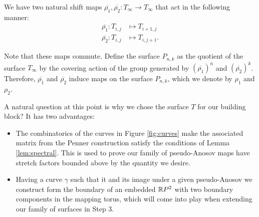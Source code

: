 We have two
natural shift maps $\overline{\rho_1},\overline{\rho_2}: T_\infty \to T_\infty$ that act in the
following manner:
\begin{align*}
  \overline{\rho_1}: T_{i,j} &\mapsto T_{i+1, j} \\
  \overline{\rho_2}: T_{i,j} &\mapsto T_{i, j+1}.
\end{align*}

Note that these maps commute. Define the surface $P_{n,k}$ as the quotient of the surface $T_\infty$ by the
covering action of the group generated by $(\overline{\rho_1})^n$ and $(\overline{\rho_2})^k$. Therefore,
$\overline{\rho_1}$ and $\overline{\rho_2}$ induce maps on the surface $P_{n,k}$, which we denote by $\rho_1$
and $\rho_2$.

A natural question at this point is why we chose the surface $T$ for our building block? It has two advantages:
\begin{itemize}
\item The combinatorics of the curves in Figure \ref{fig:curves} make the associated matrix from the Penner construction satisfy
  the conditions of Lemma \ref{lem:spectral}. This is used to prove our family of pseudo-Anosov maps have
  stretch factors bounded above by the quantity we desire.
\item Having a curve $\gamma$ such that it and its image under a given pseudo-Anosov we construct form the boundary of an embedded
  $\mathbb{R} P^2$ with two boundary components in the mapping torus, which will come into play when extending our family of surfaces in Step 3.
\end{itemize}

